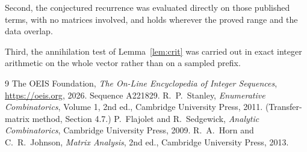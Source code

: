 \documentclass[11pt,a4paper]{article}
\theoremstyle{plain}
\theoremstyle{definition}
\begin{document}
Second, the conjectured recurrence was evaluated directly on those published terms, with no
matrices involved, and holds wherever the proved range and the data overlap.

Third, the annihilation test of Lemma~\ref{lem:crit} was carried out in exact integer
arithmetic on the whole vector rather than on a sampled prefix.

\begin{thebibliography}{9}
 The OEIS Foundation, \emph{The On-Line Encyclopedia of Integer
Sequences}, \url{https://oeis.org}, 2026. Sequence A221829.
 R.~P.~Stanley, \emph{Enumerative Combinatorics}, Volume 1, 2nd ed.,
Cambridge University Press, 2011. (Transfer-matrix method, Section 4.7.)
 P.~Flajolet and R.~Sedgewick, \emph{Analytic Combinatorics}, Cambridge
University Press, 2009.
 R.~A.~Horn and C.~R.~Johnson, \emph{Matrix Analysis}, 2nd ed., Cambridge
University Press, 2013.
\end{thebibliography}
\end{document}
